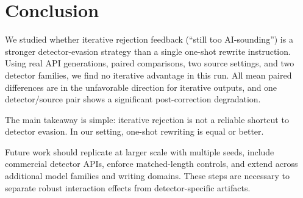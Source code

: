 \section{Conclusion}
\label{sec:conclusion}

We studied whether iterative rejection feedback (``still too AI-sounding'') is a stronger detector-evasion strategy than a single one-shot rewrite instruction. Using real API generations, paired comparisons, two source settings, and two detector families, we find no iterative advantage in this run. All mean paired differences are in the unfavorable direction for iterative outputs, and one detector/source pair shows a significant post-correction degradation.

The main takeaway is simple: iterative rejection is not a reliable shortcut to detector evasion. In our setting, one-shot rewriting is equal or better.

Future work should replicate at larger scale with multiple seeds, include commercial detector APIs, enforce matched-length controls, and extend across additional model families and writing domains. These steps are necessary to separate robust interaction effects from detector-specific artifacts.
